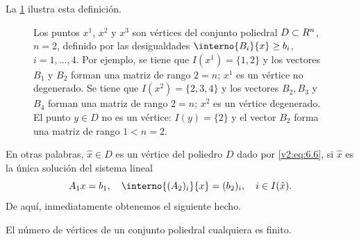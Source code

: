 La \cref{v2:fig:6.1.1} ilustra esta definición.

\begin{figure}[htpb]
    \centering
    \caption{Los puntos $x^1$, $x^2$ y $x^3$ son vértices del conjunto poliedral $D \subset R^n$, $n=2$, definido por las desigualdades $\interno{B_i}{x} \ge b_i$, $i=1,\dots,4$. Por ejemplo, se tiene que $I(x^1)=\{1,2\}$ y los vectores $B_1$ y $B_2$ forman una matriz de rango $2=n$; $x^1$ es un vértice no degenerado. Se tiene que $I(x^2)=\{2,3,4\}$ y los vectores $B_2, B_3$ y $B_4$ forman una matriz de rango $2=n$; $x^2$ es un vértice degenerado. El punto $y \in D$ no es un vértice: $I(y)=\{2\}$ y el vector $B_2$ forma una matriz de rango $1 < n=2$.}
    \label{v2:fig:6.1.1}
\end{figure}

En otras palabras, $\hat{x} \in D$ es un vértice del poliedro $D$ dado por \eqref{v2:eq:6.6}, si $\hat{x}$ es la única solución del sistema lineal
\[
    A_1 x = b_1, \quad \interno{(A_2)_i}{x} = (b_2)_i, \quad i \in I(\hat{x}).
\]
De aquí, inmediatamente obtenemos el siguiente hecho.

\begin{proposition}\label{v2:prop:6.1.1}
    El número de vértices de un conjunto poliedral cualquiera es finito.
\end{proposition}